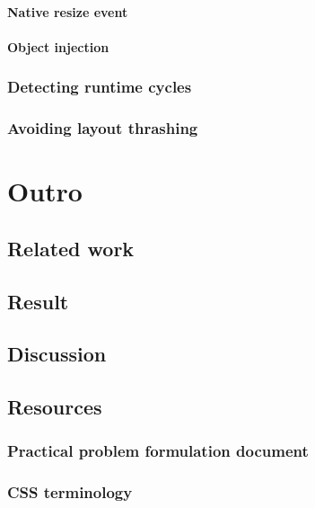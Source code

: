 \documentclass[a4paper,11pt]{kth-mag}
\begin{document}
        \subsection{Native resize event}
        \subsection{Object injection}
      \section{Detecting runtime cycles}\label{sec:imp_cycle_detector}
      \section{Avoiding layout thrashing}\label{sec:imp_batch_processor}

  \part{Outro}\label{part:outro}
    \chapter{Related work}
    \chapter{Result}
    \chapter{Discussion}
  \printbibliography
  \clearpage
  \printnoidxglossary[sort=use, type=main]
  \printnoidxglossary[sort=standard, type=\acronymtype]
  \appendix
  \addappheadtotoc
    \chapter{Resources}
      \section{Practical problem formulation document}\label{sec:problem-formulation}
      \section{CSS terminology}
\end{document}
